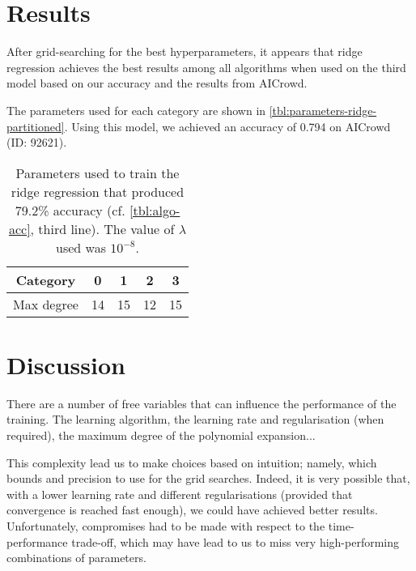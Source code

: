 \documentclass[10pt,conference,compsocconf]{IEEEtran}
\begin{document}
\section{Results}

After grid-searching for the best hyperparameters, it appears that ridge regression achieves the best results among all algorithms when used on the third model based on our accuracy and the results from AICrowd. 

The parameters used for each category are shown in \autoref{tbl:parameters-ridge-partitioned}. Using this model, we achieved an accuracy of 0.794 on AICrowd (ID: 92621).


\begin{table}
  \centering
  \begin{tabular}{ |c|c|c|c|c| } 
    \hline 
    Category   & 0  & 1  & 2  & 3  \\
    \hline
    Max degree & 14 & 15 & 12 & 15 \\
    \hline
  \end{tabular}
  \caption{Parameters used to train the ridge regression that produced 79.2\% accuracy (cf. \autoref{tbl:algo-acc}, third line). The value of $\lambda$ used was $10^{-8}$.}
  \label{tbl:parameters-ridge-partitioned}
\end{table}

\section{Discussion}
There are a number of free variables that can influence the performance
of the training. The learning algorithm, the learning rate and regularisation
(when required), the maximum degree of the polynomial expansion...

This complexity lead us to make choices based on intuition; namely,
which bounds and precision to use for the grid searches.
Indeed, it is very possible that, with a lower learning rate and
different regularisations (provided that convergence is reached fast
enough), we could have achieved better results.
Unfortunately, compromises had to be made with respect to the 
time-performance trade-off, which may have lead to us to
miss very high-performing combinations of parameters.
\end{document}
